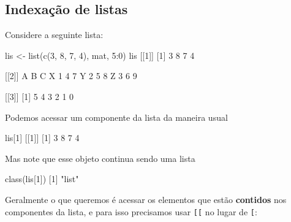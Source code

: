 \documentclass[
  10pt,
  a4paper]{book}
\newenvironment{Shaded}{\begin{snugshade}}{\end{snugshade}}
\newcommand{\DecValTok}[1]{\textcolor[rgb]{0.00,0.00,0.81}{#1}}
\newcommand{\FunctionTok}[1]{\textcolor[rgb]{0.00,0.00,0.00}{#1}}
\newcommand{\NormalTok}[1]{#1}
\newcommand{\OtherTok}[1]{\textcolor[rgb]{0.56,0.35,0.01}{#1}}
\newcommand{\SpecialCharTok}[1]{\textcolor[rgb]{0.00,0.00,0.00}{#1}}
\newcommand{\StringTok}[1]{\textcolor[rgb]{0.31,0.60,0.02}{#1}}
\begin{document}
\hypertarget{indexauxe7uxe3o-de-listas}{%
\subsection{Indexação de listas}\label{indexauxe7uxe3o-de-listas}}

Considere a seguinte lista:

\begin{Shaded}
\begin{Highlighting}[]
\NormalTok{lis }\OtherTok{\textless{}{-}} \FunctionTok{list}\NormalTok{(}\FunctionTok{c}\NormalTok{(}\DecValTok{3}\NormalTok{, }\DecValTok{8}\NormalTok{, }\DecValTok{7}\NormalTok{, }\DecValTok{4}\NormalTok{), mat, }\DecValTok{5}\SpecialCharTok{:}\DecValTok{0}\NormalTok{)}
\NormalTok{lis}
\NormalTok{[[}\DecValTok{1}\NormalTok{]]}
\NormalTok{[}\DecValTok{1}\NormalTok{] }\DecValTok{3} \DecValTok{8} \DecValTok{7} \DecValTok{4}

\NormalTok{[[}\DecValTok{2}\NormalTok{]]}
\NormalTok{  A B C}
\NormalTok{X }\DecValTok{1} \DecValTok{4} \DecValTok{7}
\NormalTok{Y }\DecValTok{2} \DecValTok{5} \DecValTok{8}
\NormalTok{Z }\DecValTok{3} \DecValTok{6} \DecValTok{9}

\NormalTok{[[}\DecValTok{3}\NormalTok{]]}
\NormalTok{[}\DecValTok{1}\NormalTok{] }\DecValTok{5} \DecValTok{4} \DecValTok{3} \DecValTok{2} \DecValTok{1} \DecValTok{0}
\end{Highlighting}
\end{Shaded}

Podemos acessar um componente da lista da maneira usual

\begin{Shaded}
\begin{Highlighting}[]
\NormalTok{lis[}\DecValTok{1}\NormalTok{]}
\NormalTok{[[}\DecValTok{1}\NormalTok{]]}
\NormalTok{[}\DecValTok{1}\NormalTok{] }\DecValTok{3} \DecValTok{8} \DecValTok{7} \DecValTok{4}
\end{Highlighting}
\end{Shaded}

Mas note que esse objeto continua sendo uma lista

\begin{Shaded}
\begin{Highlighting}[]
\FunctionTok{class}\NormalTok{(lis[}\DecValTok{1}\NormalTok{])}
\NormalTok{[}\DecValTok{1}\NormalTok{] }\StringTok{"list"}
\end{Highlighting}
\end{Shaded}

Geralmente o que queremos é acessar os elementos que estão \textbf{contidos}
nos componentes da lista, e para isso precisamos usar \texttt{{[}{[}} no lugar de
\texttt{{[}}:
\end{document}
